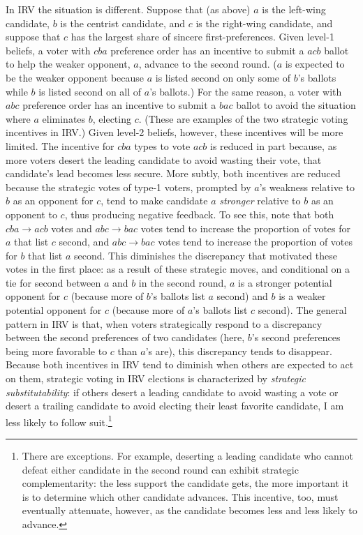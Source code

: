 \documentclass[11pt,a4paper]{article}
\begin{document}
In IRV the situation is different. Suppose that (as above) $a$ is the left-wing candidate, $b$ is the centrist candidate, and $c$ is the right-wing candidate, and suppose that $c$ has the largest share of sincere first-preferences. Given level-1 beliefs, a voter with $cba$ preference order has an incentive to submit a $acb$ ballot to help the weaker opponent, $a$, advance to the second round. ($a$ is expected to be the weaker opponent because $a$ is listed second on only some of $b$'s ballots while $b$ is listed second on all of $a$'s ballots.) For the same reason, a voter with $abc$ preference order has an incentive to submit a $bac$ ballot to avoid the situation where $a$ eliminates $b$, electing $c$. (These are examples of the two strategic voting incentives in IRV.) Given level-2 beliefs, however, these incentives will be more limited. The incentive for $cba$ types to vote $acb$ is reduced in part because, as more voters desert the leading candidate to avoid wasting their vote, that candidate's lead becomes less secure. More subtly, both incentives are reduced because the strategic votes of type-1 voters, prompted by $a$'s weakness relative to $b$ as an opponent for $c$, tend to make candidate $a$ \emph{stronger} relative to $b$ as an opponent to $c$, thus producing negative feedback. To see this, note that both $cba \rightarrow acb$ votes and $abc \rightarrow bac$ votes tend to increase the proportion of votes for $a$ that list $c$ second, and $abc \rightarrow bac$ votes tend to increase the proportion of votes for $b$ that list $a$ second. This diminishes the discrepancy that motivated these votes in the first place: as a result of these strategic moves, and conditional on a tie for second between $a$ and $b$ in the second round, $a$ is a stronger potential opponent for $c$ (because more of $b$'s ballots list $a$ second) and $b$ is a weaker potential opponent for $c$ (because more of $a$'s ballots list $c$ second). The general pattern in IRV is that, when voters strategically respond to a discrepancy between the second preferences of two candidates (here, $b$'s second preferences being more favorable to $c$ than $a$'s are), this discrepancy tends to disappear.  Because both incentives in IRV tend to diminish when others are expected to act on them, strategic voting in IRV elections is characterized by \emph{strategic substitutability}: if others desert a leading candidate to avoid wasting a vote or desert a trailing candidate to avoid electing their least favorite candidate, I am less likely to follow suit.\footnote{There are exceptions. For example, deserting a leading candidate who cannot defeat either candidate in the second round can exhibit strategic complementarity: the less support the candidate gets, the more important it is to determine which other candidate advances. This incentive, too, must eventually attenuate, however, as the candidate becomes less and less likely to advance.}
\end{document}
